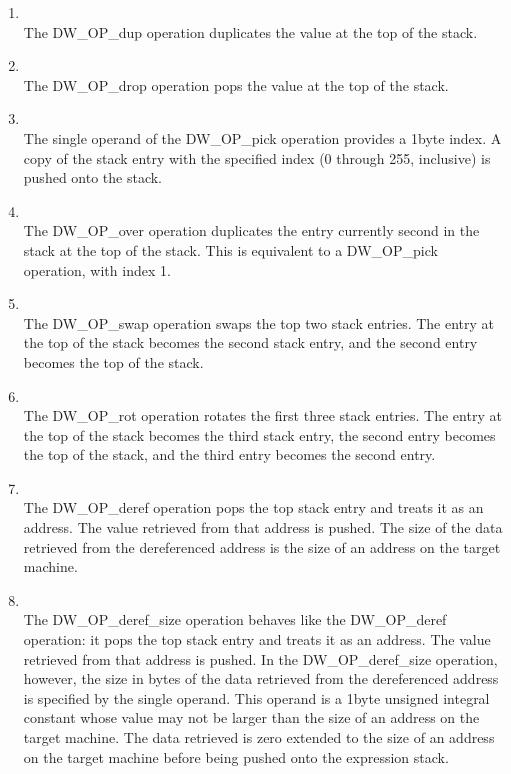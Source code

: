 \begin{enumerate}[1]
\item {} \\
The DW\_OP\_dup operation duplicates the value at the top of the stack.

\item {} \\
The DW\_OP\_drop operation pops the value at the top of the stack.

\item {} \\
The single operand of the DW\_OP\_pick operation provides a
1\dash byte index. A copy of the stack entry with the specified
index (0 through 255, inclusive) is pushed onto the stack.

\item {} \\
The DW\_OP\_over operation duplicates the entry currently second
in the stack at the top of the stack. 
This is equivalent to
a DW\_OP\_pick operation, with index 1.  

\item {} \\
The DW\_OP\_swap operation swaps the top two stack entries. 
The entry at the top of the
stack becomes the second stack entry, 
and the second entry becomes the top of the stack.

\item {} \\
The DW\_OP\_rot operation rotates the first three stack
entries. The entry at the top of the stack becomes the third
stack entry, the second entry becomes the top of the stack,
and the third entry becomes the second entry.

\item  {} \\
The DW\_OP\_deref operation pops the top stack entry and 
treats it as an address. The value
retrieved from that address is pushed. 
The size of the data retrieved from the dereferenced
address is the size of an address on the target machine.

\item {} \\
The DW\_OP\_deref\_size operation behaves like the DW\_OP\_deref
operation: it pops the top stack entry and treats it as an
address. The value retrieved from that address is pushed. In
the DW\_OP\_deref\_size operation, however, the size in bytes
of the data retrieved from the dereferenced address is
specified by the single operand. This operand is a 1\dash byte
unsigned integral constant whose value may not be larger
than the size of an address on the target machine. The data
retrieved is zero extended to the size of an address on the
target machine before being pushed onto the expression stack.


\end{enumerate}
